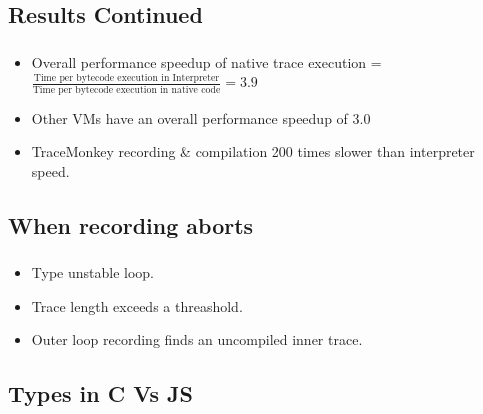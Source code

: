 \documentclass[mathserif,10pt]{beamer}
\newcommand{\cmt}[1]{}
\begin{document}
\subsection{Results Continued}
\frame
{
  \frametitle{\subsecname}
  \begin{itemize}
    \item Overall performance speedup of native trace execution  = $\frac{\text{Time per bytecode execution in Interpreter}}{\text{Time per bytecode execution in native code}  } = 3.9$
      \cmt{
    \item Native trace takes 9 cycles/ byte code as compared to the interpreter ( 35 cycle/ bytecode) 
      }
    \item Other VMs have an overall performance speedup of 3.0
    \item TraceMonkey recording \& compilation 200 times slower than interpreter speed.
  \end{itemize}
}

\subsection{When recording aborts}
\frame
{
  \frametitle{\subsecname}
  \begin{itemize}
    \item Type unstable loop.
    \item Trace length exceeds a threashold.
    \item Outer loop recording finds an uncompiled inner trace.
  \end{itemize}  
}

\subsection{Types in C Vs JS}
\frame
{
  \frametitle{\subsecname}
  \begin{figure}[h]
  \centering
  \end{figure}
}
\end{document}

